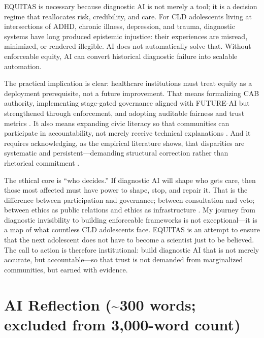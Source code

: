 EQUITAS is necessary because diagnostic AI is not merely a tool; it is a decision regime that reallocates risk, credibility, and care. For CLD adolescents living at intersections of ADHD, chronic illness, depression, and trauma, diagnostic systems have long produced epistemic injustice: their experiences are misread, minimized, or rendered illegible. AI does not automatically solve that. Without enforceable equity, AI can convert historical diagnostic failure into scalable automation.

\vspace{0.5em}
The practical implication is clear: healthcare institutions must treat equity as a deployment prerequisite, not a future improvement. That means formalizing CAB authority, implementing stage-gated governance aligned with FUTURE-AI but strengthened through enforcement, and adopting auditable fairness and trust metrics \citep{Lekadir2025, Chen2023, Sagona2025}. It also means expanding civic literacy so that communities can participate in accountability, not merely receive technical explanations \citep{GarciaBautista2025RMP}. And it requires acknowledging, as the empirical literature shows, that disparities are systematic and persistent—demanding structural correction rather than rhetorical commitment \citep{Marko2025}.

\vspace{0.5em}
The ethical core is ``who decides.'' If diagnostic AI will shape who gets care, then those most affected must have power to shape, stop, and repair it. That is the difference between participation and governance; between consultation and veto; between ethics as public relations and ethics as infrastructure \citep{Munn2023}. My journey from diagnostic invisibility to building enforceable frameworks is not exceptional—it is a map of what countless CLD adolescents face. EQUITAS is an attempt to ensure that the next adolescent does not have to become a scientist just to be believed. The call to action is therefore institutional: build diagnostic AI that is not merely accurate, but accountable—so that trust is not demanded from marginalized communities, but earned with evidence.

\newpage
\section*{AI Reflection (\texorpdfstring{\textasciitilde}{~}300 words; excluded from 3,000-word count)}


